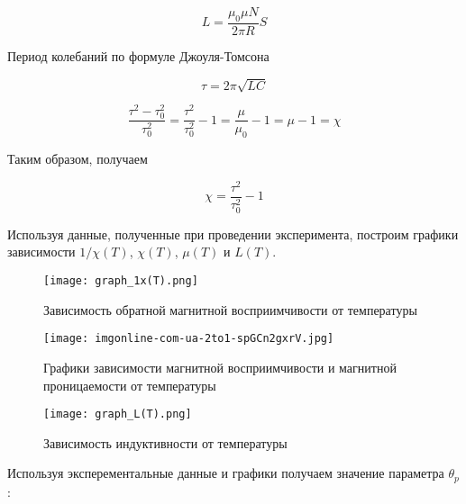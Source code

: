     \begin{equation}
        L = \frac{\mu_0 \mu N}{2 \pi R} S
    \end{equation}

    Период колебаний по формуле Джоуля-Томсона

    \begin{equation}
        \tau = 2 \pi \sqrt{L C}
    \end{equation}

    \begin{equation}
        \frac{\tau^2 - \tau_0^2}{\tau_0^2} = \frac{\tau^2}{\tau_0^2} - 1 = \frac{\mu}{\mu_0} - 1 = \mu - 1 = \chi        
    \end{equation}

    Таким образом, получаем

    \begin{equation}
        \chi = \frac{\tau^2}{\tau_0^2} - 1
    \end{equation}

    

    Используя данные, полученные при проведении эксперимента, построим графики зависимости \hyperref[graph_1x(T)]{$1/\chi(T)$},
    \hyperref[graph_x_mu_(T)]{$\chi(T)$}, \hyperref[graph_x_mu_(T)]{$\mu(T)$} и \hyperref[graph_L(T)]{$L(T)$}.

    \begin{figure}
        \centering
        \texttt{[image: graph\_1x(T).png]}
        \caption{Зависимость обратной магнитной восприимчивости от температуры}
        \label{graph_1x(T)}
    \end{figure}

    \begin{figure}
        \centering
        \texttt{[image: imgonline-com-ua-2to1-spGCn2gxrV.jpg]}
        \caption{Графики зависимости магнитной восприимчивости и магнитной проницаемости от температуры}
        \label{graph_x_mu_(T)}
    \end{figure}

    \begin{figure}[h!]
        \centering
        \texttt{[image: graph\_L(T).png]}
        \label{graph_L(T)}
        \caption{Зависимость индуктивности от температуры}
    \end{figure}

    Используя эксперементальные данные и графики получаем значение параметра $\theta_p$:

    \begin{center}
    \end{center}

